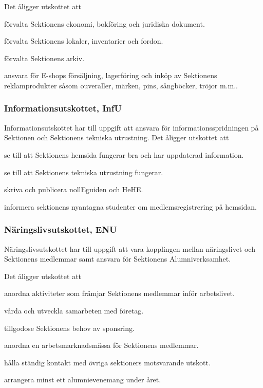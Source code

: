 \documentclass[10pt]{article}
\begin{document}
Det åligger utskottet att
\begin{tightdashlist}
\item förvalta Sektionens ekonomi, bokföring och juridiska dokument.
\item förvalta Sektionens lokaler, inventarier och fordon.
\item förvalta Sektionens arkiv.
\item ansvara för E-shops försäljning, lagerföring och inköp av Sektionens reklamprodukter såsom ouveraller, märken, pins, sångböcker, tröjor m.m..
\end{tightdashlist}

\subsubsection{Informationsutskottet, InfU}
Informationsutskottet har till uppgift att ansvara för informationsspridningen på Sektionen och Sektionens tekniska utrustning.
Det åligger utskottet att
\begin{tightdashlist}
    \item se till att Sektionens hemsida fungerar bra och har uppdaterad information.
    \item se till att Sektionens tekniska utrustning fungerar.
    \item skriva och publicera nollEguiden och HeHE.
    \item informera sektionens nyantagna studenter om medlemsregistrering på hemsidan.
\end{tightdashlist}

\subsubsection{Näringslivsutskottet, ENU}
Näringslivsutskottet har till uppgift att vara kopplingen mellan näringslivet och Sektionens medlemmar samt ansvara för Sektionens Alumniverksamhet.

Det åligger utskottet att
\begin{tightdashlist}
\item anordna aktiviteter som främjar Sektionens medlemmar inför arbetslivet.
\item vårda och utveckla samarbeten med företag.
\item tillgodose Sektionens behov av sponsring.
\item anordna en arbetsmarknadsmässa för Sektionens medlemmar.
\item hålla ständig kontakt med övriga sektioners motsvarande utskott.
\item arrangera minst ett alumnievenemang under året.
\end{tightdashlist}
\end{document}
